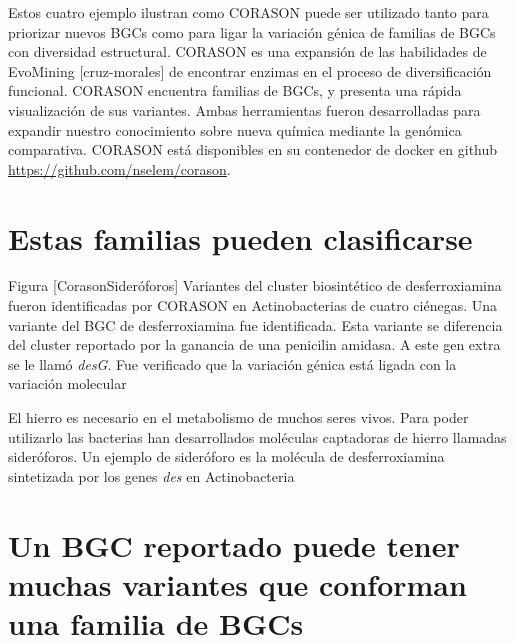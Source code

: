 \documentclass[12pt,twoside]{reedthesis}
\begin{document}
  Estos cuatro ejemplo ilustran como CORASON puede ser utilizado tanto
  para priorizar nuevos BGCs como para ligar la variación génica de
  familias de BGCs con diversidad estructural. CORASON es una expansión de
  las habilidades de EvoMining {[}cruz-morales{]} de encontrar enzimas en
  el proceso de diversificación funcional. CORASON encuentra familias de
  BGCs, y presenta una rápida visualización de sus variantes. Ambas
  herramientas fueron desarrolladas para expandir nuestro conocimiento
  sobre nueva química mediante la genómica comparativa. CORASON está
  disponibles en su contenedor de docker en github
  \url{https://github.com/nselem/corason}.
  
  \section{Estas familias pueden
  clasificarse}\label{estas-familias-pueden-clasificarse}
  
  Figura {[}CorasonSideróforos{]} Variantes del cluster biosintético de
  desferroxiamina fueron identificadas por CORASON en Actinobacterias de
  cuatro ciénegas. Una variante del BGC de desferroxiamina fue
  identificada. Esta variante se diferencia del cluster reportado por la
  ganancia de una penicilin amidasa. A este gen extra se le llamó
  \emph{desG}. Fue verificado que la variación génica está ligada con la
  variación molecular
  
  El hierro es necesario en el metabolismo de muchos seres vivos. Para
  poder utilizarlo las bacterias han desarrollados moléculas captadoras de
  hierro llamadas sideróforos. Un ejemplo de sideróforo es la molécula de
  desferroxiamina sintetizada por los genes \emph{des} en Actinobacteria
  
  \section{Un BGC reportado puede tener muchas variantes que conforman una
  familia de
  BGCs}\label{un-bgc-reportado-puede-tener-muchas-variantes-que-conforman-una-familia-de-bgcs}
  
\end{document}

